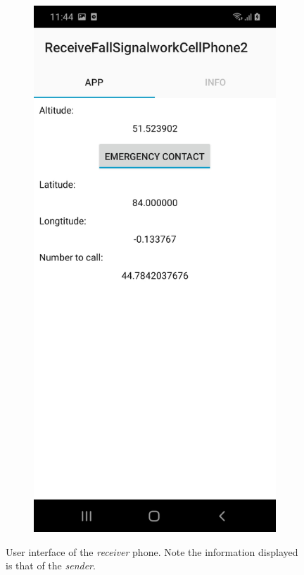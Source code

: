 \documentclass[12pt,a4paper]{article}
\begin{document}
\begin{figure}[h]
\begin{subfigure}[t]{0.4\textwidth}
        \caption{}
    \end{subfigure}
    \begin{subfigure}[t]{0.4\textwidth}
        \centering
        \includegraphics[width=\textwidth]{files/InterfaceTriggered.jpeg}
        \caption{}
    \end{subfigure}
    \caption{User interface of the \textit{receiver} phone. Note the information displayed is that of the \textit{sender}.}
\end{figure}
\end{document}
